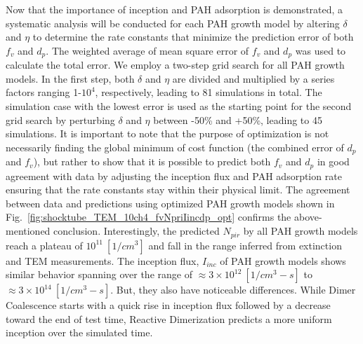 Now that the importance of inception and PAH adsorption is demonstrated, a systematic analysis will be conducted for each PAH growth model by altering $\delta$ and $\eta$ to determine the rate constants that minimize the prediction error of both $f_v$ and $d_p$. The weighted average of mean square error of $f_v$ and  $d_p$ was used to calculate the total error. We employ a two-step grid search for all PAH growth models. In the first step, both $\delta$ and $\eta$ are divided and multiplied by a series factors ranging 1-$10^4$, respectively, leading to 81 simulations in total. The simulation case with the lowest error is used as the starting point for the second grid search by perturbing $\delta$ and $\eta$ between -50\% and +50\%, leading to 45 simulations. It is important to note that the purpose of optimization is not necessarily finding the global minimum of cost function (the combined error of $d_p$ and $f_v$), but rather to show that it is possible to predict both $f_v$ and $d_p$ in good agreement with data by adjusting the inception flux and PAH adsorption rate ensuring that the rate constants stay within their physical limit. The agreement between data and predictions using optimized PAH growth models shown in Fig.~\ref{fig:shocktube_TEM_10ch4_fvNpriIincdp_opt} confirms the above-mentioned conclusion. Interestingly, the predicted $N_{pir}$ by all PAH growth models reach a plateau of $10^{11} \: [1/cm^3]$ and fall in the range inferred from extinction and TEM measurements. The inception flux, $I_{inc}$ of PAH growth models shows similar behavior spanning over the range of $\approx3\times10^{12} \: [1/cm^3-s]$ to $\approx3\times10^{14} \: [1/cm^3-s]$. But, they also have noticeable differences. While Dimer Coalescence starts with a quick rise in inception flux followed by a decrease toward the end of test time, Reactive Dimerization predicts a more uniform inception over the simulated time. 


